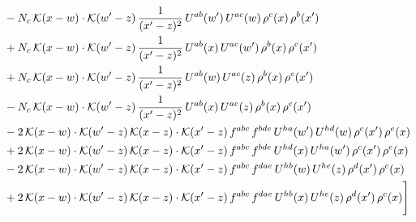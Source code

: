 \documentclass[9pt]{article}
\numberwithin{equation}{section}
\begin{document}
\begin{align}
&-N_{c}\,\mathcal{K}(x-w)\cdot\mathcal{K}(w'-z)\,\frac{1}{(x'-z)^{2}}\,U^{ab}(w')\,U^{ac}(w)\,\rho^{c}(x)\,\rho^{b}(x')\notag \\ & +N_{c}\,\mathcal{K}(x-w)\cdot\mathcal{K}(w'-z)\,\frac{1}{(x'-z)^{2}}\,U^{ab}(x)\,U^{ac}(w')\,\rho^{b}(x)\,\rho^{c}(x')\notag\\
&+N_{c}\,\mathcal{K}(x-w)\cdot\mathcal{K}(w'-z)\,\frac{1}{(x'-z)^{2}}\,U^{ab}(w)\,U^{ac}(z)\,\rho^{b}(x)\,\rho^{c}(x')\notag\\
&-N_{c}\,\mathcal{K}(x-w)\cdot\mathcal{K}(w'-z)\,\frac{1}{(x'-z)^{2}}\,U^{ab}(x)\,U^{ac}(z)\,\rho^{b}(x)\,\rho^{c}(x')\notag\\
&-2\,\mathcal{K}(x-w)\cdot\mathcal{K}(w'-z)\,\mathcal{K}(x-z)\cdot\mathcal{K}(x'-z)\,f^{abc}\,f^{bde}\,U^{ha}(w')\,U^{hd}(w)\,\rho^{c}(x')\,\rho^{e}(x)\notag\\
&+2\,\mathcal{K}(x-w)\cdot\mathcal{K}(w'-z)\,\mathcal{K}(x-z)\cdot\mathcal{K}(x'-z)\,f^{abc}\,f^{bde}\,U^{hd}(x)\,U^{ha}(w')\,\rho^{c}(x')\,\rho^{e}(x)\notag\\
&-2\,\mathcal{K}(x-w)\cdot\mathcal{K}(w'-z)\,\mathcal{K}(x-z)\cdot\mathcal{K}(x'-z)\,f^{abc}\,f^{dae}\,U^{hb}(w)\,U^{he}(z)\,\rho^{d}(x')\,\rho^{c}(x)\notag\\
&+2\,\mathcal{K}(x-w)\cdot\mathcal{K}(w'-z)\,\mathcal{K}(x-z)\cdot\mathcal{K}(x'-z)\,f^{abc}\,f^{dae}\,U^{hb}(x)\,U^{he}(z)\,\rho^{d}(x')\,\rho^{c}(x)\Bigg]
\end{align}
\end{document}
